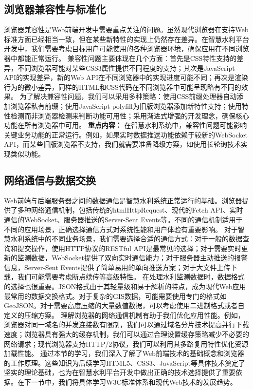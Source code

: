 \subsection{浏览器兼容性与标准化}\label{ux6d4fux89c8ux5668ux517cux5bb9ux6027ux4e0eux6807ux51c6ux5316}
浏览器兼容性是Web前端开发中需要重点关注的问题。虽然现代浏览器在支持Web标准方面已经相当一致，但在某些新特性的实现上仍然存在差异。在智慧水利平台开发中，我们需要考虑目标用户可能使用的各种浏览器环境，确保应用在不同浏览器中都能正常运行。
兼容性问题主要体现在几个方面：首先是CSS特性支持的差异，不同浏览器可能对某些CSS3属性提供不同程度的支持；其次是JavaScript API的实现差异，新的Web
API在不同浏览器中的实现进度可能不同；再次是渲染行为的微小差异，同样的HTML和CSS代码在不同浏览器中可能呈现略有不同的效果。
为了解决兼容性问题，我们可以采用多种策略：使用CSS前缀处理器自动添加浏览器私有前缀；使用JavaScript
polyfill为旧版浏览器添加新特性支持；使用特性检测而非浏览器检测来判断功能可用性；采用渐进式增强的开发理念，确保核心功能在所有浏览器中可用。 \textbf{重点内容：}
在智慧水利系统中，兼容性问题可能影响关键业务功能的正常运行。例如，如果实时数据推送功能依赖于较新的WebSocket API，而某些旧版浏览器不支持，我们就需要准备降级方案，如使用长轮询技术实现类似功能。
\subsection{网络通信与数据交换}\label{ux7f51ux7edcux901aux4fe1ux4e0eux6570ux636eux4ea4ux6362}
Web前端与后端服务器之间的数据通信是智慧水利系统正常运行的基础。浏览器提供了多种网络通信机制，包括传统的htmlHttpRequest、现代的Fetch API、实时通信的WebSocket、服务器推送的Server-Sent
Events等。不同的通信机制适用于不同的应用场景，正确选择通信方式对系统性能和用户体验有重要影响。 对于智慧水利系统中的不同业务场景，我们需要选择合适的通信方式：对于一般的数据查询和提交操作，使用HTTP协议的RESTful
API是最常见的选择；对于需要实时更新的监测数据，WebSocket提供了双向实时通信能力；对于服务器主动推送的报警信息，Server-Sent
Events提供了简单易用的单向推送方案；对于大文件上传下载，我们可能需要考虑断点续传等高级特性。
在处理水利监测数据时，数据格式的选择也很重要。JSON格式由于其轻量级和易于解析的特点，成为现代Web应用最常用的数据交换格式。对于复杂的GIS数据，可能需要使用专门的格式如GeoJSON。对于需要高度压缩的大量数值数据，可以考虑使用二进制格式或者自定义的压缩方案。
理解浏览器的网络通信机制有助于我们优化应用性能。例如，浏览器对同一域名的并发连接数有限制，我们可以通过域名分片技术提高并行下载速度；浏览器具有强大的缓存机制，我们可以通过合理设置缓存策略减少不必要的网络请求；现代浏览器支持HTTP/2协议，我们可以利用其多路复用特性优化资源加载性能。
通过本节的学习，我们深入了解了Web前端技术的基础概念和浏览器的工作原理。这些知识为后续学习HTML5、CSS3、JavaScript等具体技术奠定了坚实的理论基础，也为在智慧水利平台开发中做出正确的技术选择提供了重要依据。在下一节中，我们将具体学习W3C标准体系和现代Web技术的发展趋势。
